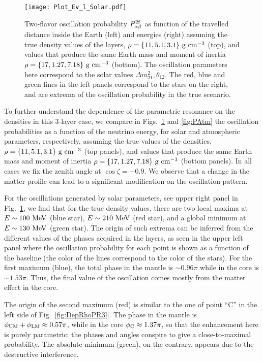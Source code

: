 \begin{figure}
\begin{center}
\texttt{[image: Plot\_Ev\_l\_Solar.pdf]}
\caption{Two-flavor oscillation probability $P_{\alpha\beta}^{\rm 2f}$ as function of the travelled distance inside the Earth (left) and energies (right) assuming the true density values of the layers, $\rho=\{11,5.1,3.1\}~{\rm g\ cm^{-3}}$ (top), and values that produce the same Earth mass and moment of inertia $\rho=\{17,1.27,7.18\}~{\rm g\ cm^{-3}}$ (bottom). The oscillation parameters here correspond to the solar values $\Delta m_{21}^2, \theta_{12}$. The red, blue and green lines in the left panels correspond to the stars on the right, and are extrema of the oscillation probability in the true scenario. \label{fig:PSol}}
\end{center}
\end{figure}
To further understand the dependence of the parametric resonance on the densities in this 3-layer case, we compare in Figs.~\ref{fig:PSol} and \ref{fig:PAtm} the oscillation probabilities as a function of the neutrino energy, for solar and atmospheric parameters, respectively, assuming the true values of the densities, $\rho=\{11,5.1,3.1\}~{\rm g\ cm^{-3}}$ (top panels), and values that produce the same Earth mass and moment of inertia $\rho=\{17,1.27,7.18\}~{\rm g\ cm^{-3}}$ (bottom panels).
In all cases we fix the zenith angle at $\cos\zeta=-0.9$. 
We observe that a change in the matter profile can lead to a significant modification on the oscillation pattern. 

For the oscillations generated by solar parameters, see upper right panel in Fig.~\ref{fig:PSol}, we find that for the true density values, there are two local maxima at $E\sim 100~{\rm MeV}$ (blue star), $E\sim210~{\rm MeV}$ (red star), and a global minimum at $E\sim 130~{\rm MeV}$ (green star). 
The origin of such extrema can be inferred from the different values of the phases acquired in the layers, as seen in the upper left panel where the oscillation probability for each point is shown as a function of the baseline (the color of the lines correspond to the color of the stars). 
For the first maximum (blue), the total phase in the mantle is $\sim 0.96\pi$ while in the core is $\sim 1.53\pi$. 
Thus, the final value of the  oscillation comes mostly from the matter effect in the core.

The origin of the second maximum (red) is similar to the one of point ``C'' in the left side of  Fig.~\ref{fig:DepRhoPR3l}. 
The phase in the mantle is $\phi_{\rm UM}+\phi_{\rm LM}\approx 0.57\pi$, while in the core $\phi_{\rm C}\approx 1.37\pi$, so that the enhancement here is purely parametric: the phases and angles conspire to give a close-to-maximal probability.
The absolute minimum (green), on the contrary, appears due to the destructive interference. 

